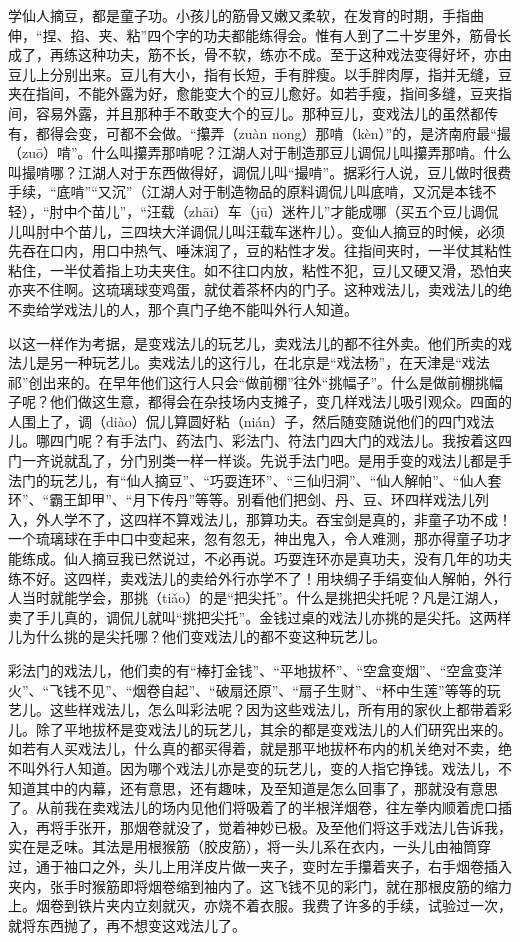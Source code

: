 \documentclass[12pt,UTF8]{ctexbook}
\begin{document}
学仙人摘豆，都是童子功。小孩儿的筋骨又嫩又柔软，在发育的时期，手指曲伸，“捏、掐、夹、粘”四个字的功夫都能练得会。惟有人到了二十岁里外，筋骨长成了，再练这种功夫，筋不长，骨不软，练亦不成。至于这种戏法变得好坏，亦由豆儿上分别出来。豆儿有大小，指有长短，手有胖瘦。以手胖肉厚，指并无缝，豆夹在指间，不能外露为好，愈能变大个的豆儿愈好。如若手瘦，指间多缝，豆夹指间，容易外露，并且那种手不敢变大个的豆儿。那种豆儿，变戏法儿的虽然都传有，都得会变，可都不会做。“攥弄（zuàn nong）那啃（kèn）”的，是济南府最“撮（zuō）啃”。什么叫攥弄那啃呢？江湖人对于制造那豆儿调侃儿叫攥弄那啃。什么叫撮啃哪？江湖人对于东西做得好，调侃儿叫“撮啃”。据彩行人说，豆儿做时很费手续，“底啃”“又沉”（江湖人对于制造物品的原料调侃儿叫底啃，又沉是本钱不轻），“肘中个苗儿”，“汪载（zhāi）车（jū）迷杵儿”才能成哪（买五个豆儿调侃儿叫肘中个苗儿，三四块大洋调侃儿叫汪载车迷杵儿）。变仙人摘豆的时候，必须先吞在口内，用口中热气、唾沫润了，豆的粘性才发。往指间夹时，一半仗其粘性粘住，一半仗着指上功夫夹住。如不往口内放，粘性不犯，豆儿又硬又滑，恐怕夹亦夹不住啊。这琉璃球变鸡蛋，就仗着茶杯内的门子。这种戏法儿，卖戏法儿的绝不卖给学戏法儿的人，那个真门子绝不能叫外行人知道。

以这一样作为考据，是变戏法儿的玩艺儿，卖戏法儿的都不往外卖。他们所卖的戏法儿是另一种玩艺儿。卖戏法儿的这行儿，在北京是“戏法杨”，在天津是“戏法祁”创出来的。在早年他们这行人只会“做前棚”往外“挑幅子”。什么是做前棚挑幅子呢？他们做这生意，都得会在杂技场内支摊子，变几样戏法儿吸引观众。四面的人围上了，调（diào）侃儿算圆好粘（nián）子，然后随变随说他们的四门戏法儿。哪四门呢？有手法门、药法门、彩法门、符法门四大门的戏法儿。我按着这四门一齐说就乱了，分门别类一样一样谈。先说手法门吧。是用手变的戏法儿都是手法门的玩艺儿，有“仙人摘豆”、“巧耍连环”、“三仙归洞”、“仙人解帕”、“仙人套环”、“霸王卸甲”、“月下传丹”等等。别看他们把剑、丹、豆、环四样戏法儿列入，外人学不了，这四样不算戏法儿，那算功夫。吞宝剑是真的，非童子功不成！一个琉璃球在手中口中变起来，忽有忽无，神出鬼入，令人难测，那亦得童子功才能练成。仙人摘豆我已然说过，不必再说。巧耍连环亦是真功夫，没有几年的功夫练不好。这四样，卖戏法儿的卖给外行亦学不了！用块绸子手绢变仙人解帕，外行人当时就能学会，那挑（tiǎo）的是“把尖托”。什么是挑把尖托呢？凡是江湖人，卖了手儿真的，调侃儿就叫“挑把尖托”。金钱过桌的戏法儿亦挑的是尖托。这两样儿为什么挑的是尖托哪？他们变戏法儿的都不变这种玩艺儿。

彩法门的戏法儿，他们卖的有“棒打金钱”、“平地拔杯”、“空盒变烟”、“空盒变洋火”、“飞钱不见”、“烟卷自起”、“破扇还原”、“扇子生财”、“杯中生莲”等等的玩艺儿。这些样戏法儿，怎么叫彩法呢？因为这些戏法儿，所有用的家伙上都带着彩儿。除了平地拔杯是变戏法儿的玩艺儿，其余的都是变戏法儿的人们研究出来的。如若有人买戏法儿，什么真的都买得着，就是那平地拔杯布内的机关绝对不卖，绝不叫外行人知道。因为哪个戏法儿亦是变的玩艺儿，变的人指它挣钱。戏法儿，不知道其中的内幕，还有意思，还有趣味，及至知道是怎么回事了，那就没有意思了。从前我在卖戏法儿的场内见他们将吸着了的半根洋烟卷，往左拳内顺着虎口插入，再将手张开，那烟卷就没了，觉着神妙已极。及至他们将这手戏法儿告诉我，实在是乏味。其法是用根猴筋（胶皮筋），将一头儿系在衣内，一头儿由袖筒穿过，通于袖口之外，头儿上用洋皮片做一夹子，变时左手攥着夹子，右手烟卷插入夹内，张手时猴筋即将烟卷缩到袖内了。这飞钱不见的彩门，就在那根皮筋的缩力上。烟卷到铁片夹内立刻就灭，亦烧不着衣服。我费了许多的手续，试验过一次，就将东西抛了，再不想变这戏法儿了。
\end{document}
